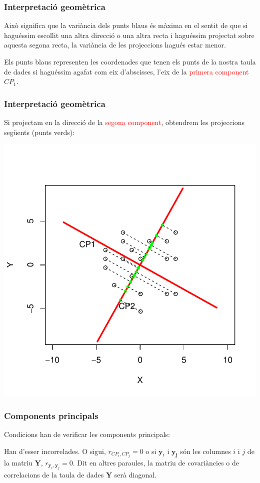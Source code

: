 \documentclass[12pt,t]{beamer}
\newcommand{\red}[1]{\textcolor{red}{#1}}
\theoremstyle{plain}
\theoremstyle{definition}
\begin{document}
\begin{frame}
\frametitle{Interpretació geomètrica}
Això significa que la variància dels punts blaus és màxima en el sentit de que si haguéssim escollit una altra direcció o una altra recta i haguéssim projectat sobre aquesta segona recta, la variància de les projeccions hagués estar menor.
\medskip

Els punts blaus representen les coordenades que tenen els punts de la nostra taula de dades si haguéssim agafat com eix d'abscisses, l'eix de la \red{primera component} $CP_1$.
\end{frame}

\begin{frame}
\frametitle{Interpretació geomètrica}
{\small Si projectam en la direcció de la \red{segona component}, obtendrem les projeccions següents (punts verds):}
\vspace*{-1cm}

\includegraphics{ACP-004}
\end{frame}


\begin{frame}
\frametitle{Components principals}
Condicions han de verificar les components principals:
\begin{block}{Han d'esser incorrelades.}
O sigui, $r_{CP_i,CP_j}=0$ o si $\mathbf{y}_i$ i $\mathbf{y_j}$ són les columnes $i$ i $j$ de la matriu $\mathbf{Y}$, $r_{\mathbf{y}_i,\mathbf{y}_j}=0$. Dit en altres paraules, la matriu de covariàncies o de correlacions de la taula de dades $\mathbf{Y}$ serà diagonal.
\end{block}
\end{frame}
\end{document}
